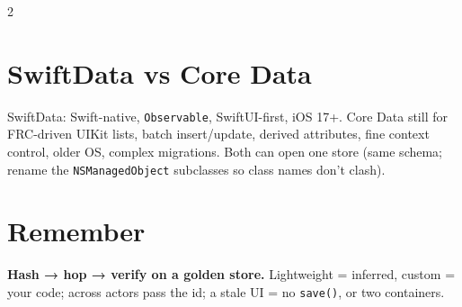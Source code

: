 \documentclass[8pt]{extarticle}
\begin{document}
\begin{multicols}{2}
\section{SwiftData vs Core Data}
SwiftData: Swift-native, \texttt{Observable}, SwiftUI-first, iOS 17+. Core Data still for
FRC-driven UIKit lists, batch insert/update, derived attributes, fine context control,
older OS, complex migrations. Both can open one store (same schema; rename the
\texttt{NSManagedObject} subclasses so class names don't clash).

\section{Remember}
\textbf{Hash → hop → verify on a golden store.} Lightweight = inferred, custom = your code;
across actors pass the id; a stale UI = no \texttt{save()}, or two containers.

\end{multicols}

\end{document}
